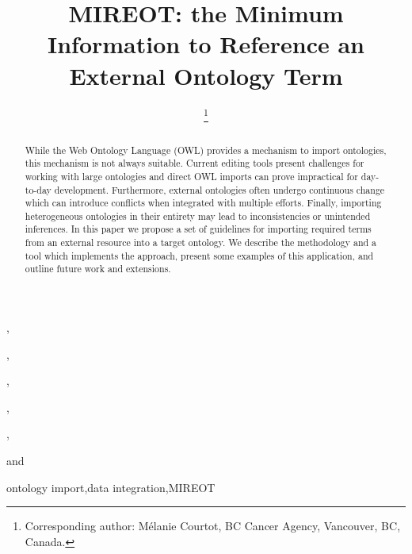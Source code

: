 \documentclass{ao2e}%
\begin{document}
\begin{frontmatter}                           %
%
\title{ MIREOT: the Minimum Information to Reference an External Ontology Term}

\author[A]{ %
\thanks{Corresponding author: M\'elanie Courtot, BC Cancer Agency, Vancouver, BC, Canada.}},
\author[B]{ },
\author[C]{ },
\author[D]{ },
\author[E]{ },
\author[A]{ }
and
\author[F]{ }

\address[A]{BC Cancer Agency, Vancouver, BC, Canada\\
E-mail: mcourtot@gmail.com, rbrinkman@bccrc.ca}

\address[B]{Abcam plc, 332 Cambridge Science Park, Cambridge, CB4 OWN, UK\\
E-mail: fgibson@gmail.com}

\address[C]{CISBAN and School of Computing Science, Newcastle University, Newcastle upon Tyne, UK\\
E-mail: a.l.lister@newcastle.ac.uk}

\address[D]{The European Bioinformatics Institute, Cambridge, CB10 1SD, UK\\
E-mail: malone@ebi.ac.uk}

\address[E]{Institute of Medical Biometry and Medical Informatics (IMBI), University Medical Center, 70104 Freiburg, Germany\\
E-mail: schober@imbi.uni-freiburg.de}

\address[F]{Science Commons, Cambridge, MA, USA\\
E-mail: alanruttenberg@gmail.com}


\begin{abstract}
While the Web Ontology Language (OWL) provides a mechanism to import ontologies, this mechanism is not always suitable.
Current editing tools present challenges for working with large ontologies and direct OWL imports can prove impractical for day-to-day development.
Furthermore, external ontologies often undergo continuous change which can introduce conflicts when integrated with multiple efforts.
Finally, importing heterogeneous ontologies in their entirety may lead to inconsistencies or unintended inferences.
In this paper we propose a set of guidelines for importing required terms from an external resource into a target ontology.
We describe the methodology and a tool which implements the approach, present some examples of this application, and outline future work and extensions.
\end{abstract}


\begin{keyword}
ontology import\sep data integration\sep MIREOT
\end{keyword}

\end{frontmatter}
\end{document}
